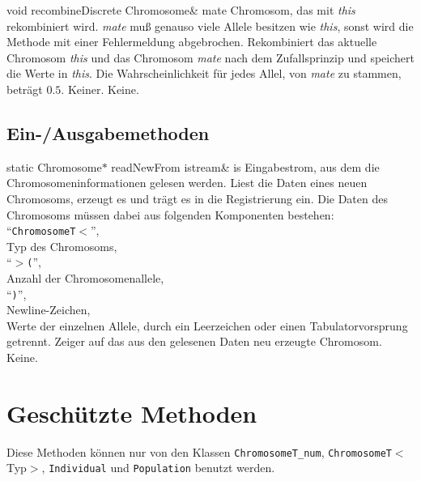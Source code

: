 \documentclass{report}
\begin{document}
\newpage

    \printMethodWithOneParam
    {void} 
    {recombineDiscrete}
    {Chromosome\&} 
    {mate} 
    {Chromosom, das mit {\em this} 
    rekombiniert wird. {\em mate} mu{\ss} genauso viele Allele besitzen wie {\em this}, sonst wird die Methode mit einer Fehlermeldung abgebrochen.}
    {Rekombiniert das aktuelle Chromosom {\em this} und
    das Chromosom {\em mate} nach dem Zufallsprinzip und speichert die Werte in
    {\em this}. Die Wahrscheinlichkeit f\"ur jedes Allel, von {\em mate} zu stammen,
    betr\"agt $0.5$.}
    {Keiner.}
    {Keine.}

\subsection{Ein-/Ausgabemethoden}

    \setNormalInstance
    \printMethodWithOneParam
    {static Chromosome$\ast$} 
    {readNewFrom}
    {istream\&} 
    {is}
    {Eingabestrom, aus dem die Chromosomeninformationen gelesen werden.}
    {Liest die Daten eines neuen Chromosoms, erzeugt es und tr\"agt es in die
     Registrierung ein. Die Daten des Chromosoms m\"ussen dabei aus 
     folgenden Komponenten bestehen:\\
     ``{\tt ChromosomeT$<$}'',\\ 
     Typ des Chromosoms,\\ 
     ``{\tt $>$(}'',\\ 
     Anzahl der Chromosomenallele,\\
     ``{\tt )}'',\\ 
     Newline-Zeichen,\\
     Werte der einzelnen Allele, durch ein Leerzeichen oder einen
     Tabulatorvorsprung getrennt.}
    {Zeiger auf das aus den gelesenen Daten neu erzeugte Chromosom.}
    {Keine.}

\newpage
\section{Gesch\"utzte Methoden}
Diese Methoden k\"onnen nur von den Klassen {\tt ChromosomeT\_num}, 
{\tt ChromosomeT}$<$Typ$>$, {\tt Individual} und {\tt Population} benutzt 
werden.
\end{document}
